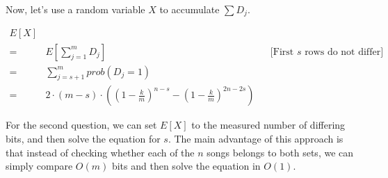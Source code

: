 \documentclass[a4paper]{article}
\begin{document}
Now, let's use a random variable $X$ to accumulate $\sum D_j$.

\begin{align*}
E[X] \\
= & E[\sum_{j=1}^m D_j] && \text{[First $s$ rows do not differ]} \\
= & \sum_{j=s+1}^m {prob}(D_j=1) \\
= & 2\cdot (m-s) \cdot \left ( \left ( 1 - \frac{k}{m} \right )^{n-s}  - \left ( 1 - \frac{k}{m} \right )^{2n-2s} \right )
\end{align*}


For the second question, we can set $E[X]$ to the measured number of differing bits, and then solve the equation for $s$. The main advantage of this approach is that instead of checking whether each of the $n$ songs belongs to both sets, we can simply compare $O(m)$ bits and then solve the equation in $O(1)$.
\end{document}
